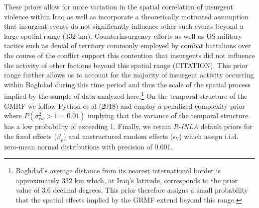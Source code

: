 \documentclass[12pt]{article}
\begin{document}
These priors allow for more variation in the spatial correlation of insurgent violence within Iraq as well as incorporate a theoretically motivated assumption that insurgent events do not significantly influence other such events beyond a large spatial range (332 km). Counterinsurgency efforts as well as US military tactics such as denial of territory commonly employed by combat battalions over the course of the conflict support this contention that insurgents did not influence the activity of other factions beyond this spatial range (CITATION). This prior range further allows us to account for the majority of insurgent activity occurring within Baghdad during this time period and thus the scale of the spatial process implied by the sample of data analyzed here.\footnote{Baghdad's average distance from its nearest international border is approximately 332 km which, at Iraq's latitude, corresponds to the prior value of 3.6 decimal degrees. This prior therefore assigns a small probability that the spatial effects implied by the GRMF extend beyond this range.} On the temporal structure of the GMRF we follow Python et al (2018) and employ a penalized complexity prior where $P(\sigma^2_{rw} > 1 = 0.01)$ implying that the variance of the temporal structure has a low probability of exceeding 1. Finally, we retain \textit{R-INLA} default priors for the fixed effects ($\beta_v$) and unstructured random effects ($\epsilon_V$) which assign i.i.d. zero-mean normal distributions with precision of 0.001.



\end{document}
